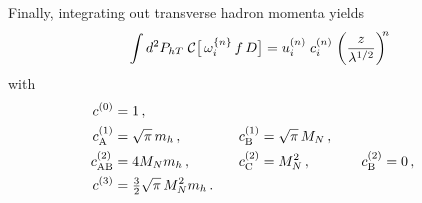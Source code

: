 \documentclass[a4paper,11pt]{article}
\newcommand{\be}{\begin{equation}}
\newcommand{\ee}{\end{equation}}
\newcommand{\mh}{ m_h }
\def\Phperp{P_{hT}}
\newcommand*{\BibPath}{.}%
\begin{document}
Finally, integrating out transverse hadron momenta yields
\be
	\int d^2\Phperp\;
	{\cal C}\bigl[\,\omega^{\{n\}}_{i} \, f \, D \bigr]
	= u^{(n)}_{i} \;c^{(n)}_{i}\;\biggl(\frac{z}{\lambda^{1/2}}\biggr)^{\!\!n}
\ee
with
\begin{alignat}{7}
	c^{(0)}_{\rm  } 	&= 1 \, , \\
	c^{(1)}_{\rm A} 	&= \sqrt{\pi}\,\mh	\, , &
	c^{(1)}_{\rm B} 	&= \sqrt{\pi}\,M_N	\, , \\
	c^{(2)}_{\rm AB} 	&= 4M_N\mh		\, , \;\;\;\;\;\; &
	c^{(2)}_{\rm C} 	&= M_N^2 		\, , \;\;\;\;\;\;\;\;\;\; &
	c^{(2)}_{\rm B}	&= 0 			\, ,\\
	c^{(3)}_{\rm  } 	&= {\textstyle\frac32}\sqrt{\pi} \,M_N^2\mh
	\, . \;\;\;     &
			&
	\label{Eq:Gaussian-integrals-working-IV}
\end{alignat}


\end{document}
